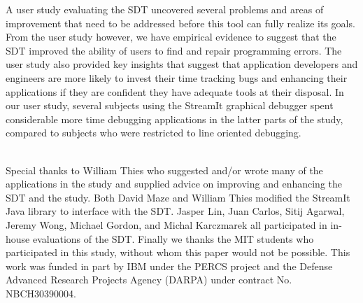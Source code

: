 \documentclass[11pt, letterpaper, onecolumn]{article}
\begin{document}
A user study  evaluating the SDT uncovered several  problems and areas
of improvement  that need to be  addressed before this  tool can fully
realize its  goals.  From  the user study  however, we  have empirical
evidence to suggest that the SDT improved the ability of users to find
and  repair  programming errors.  The  user  study  also provided  key
insights that  suggest that  application developers and  engineers are
more likely  to invest  their time tracking  bugs and  enhancing their
applications if they  are confident they have adequate  tools at their
disposal.  In our  user  study, several  subjects  using the  StreamIt
graphical debugger spent considerable more time debugging applications
in  the latter  parts  of the  study,  compared to  subjects who  were
restricted to line oriented debugging.


\singlespacing

\\ Special  thanks to William Thies who
suggested  and/or wrote  many of  the  applications in  the study  and
supplied advice on improving and enhancing the SDT and the study. Both
David Maze  and William  Thies modified the  StreamIt Java  library to
interface with the SDT. Jasper Lin, Juan Carlos, Sitij Agarwal, Jeremy
Wong,  Michael  Gordon,  and  Michal Karczmarek  all  participated  in
in-house evaluations of  the SDT.  Finally we thanks  the MIT students
who participated in  this study, without whom this  paper would not be
possible.  This work was funded in part by IBM under the PERCS project
and  the  Defense  Advanced  Research Projects  Agency  (DARPA)  under
contract No. NBCH30390004.




\end{document}
